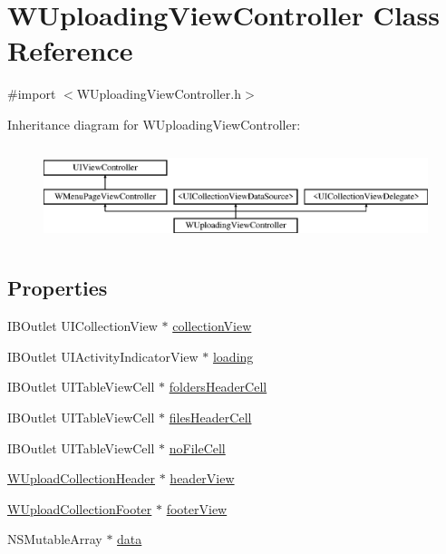 \hypertarget{interface_w_uploading_view_controller}{\section{W\-Uploading\-View\-Controller Class Reference}
\label{interface_w_uploading_view_controller}
}


{\ttfamily \#import $<$W\-Uploading\-View\-Controller.\-h$>$}

Inheritance diagram for W\-Uploading\-View\-Controller\-:\begin{figure}[H]
\begin{center}
\leavevmode
\includegraphics[height=2.857143cm]{interface_w_uploading_view_controller}
\end{center}
\end{figure}
\subsection*{Properties}
\begin{DoxyCompactItemize}
\item 
I\-B\-Outlet U\-I\-Collection\-View $\ast$ \hyperlink{interface_w_uploading_view_controller_aabe11a41ca66d2b6137c9fe6398df4ff}{collection\-View}
\item 
I\-B\-Outlet U\-I\-Activity\-Indicator\-View $\ast$ \hyperlink{interface_w_uploading_view_controller_a0f8c043f0cae730321e3a3cde2db8372}{loading}
\item 
I\-B\-Outlet U\-I\-Table\-View\-Cell $\ast$ \hyperlink{interface_w_uploading_view_controller_ad4783f87ba6e1288e4fa6126a3f5ce8c}{folders\-Header\-Cell}
\item 
I\-B\-Outlet U\-I\-Table\-View\-Cell $\ast$ \hyperlink{interface_w_uploading_view_controller_a2bfd823ee673dadc310fb2f0eaddbdd8}{files\-Header\-Cell}
\item 
I\-B\-Outlet U\-I\-Table\-View\-Cell $\ast$ \hyperlink{interface_w_uploading_view_controller_a6a3ce2d6d03b1ee89f39e5bc0972c76c}{no\-File\-Cell}
\item 
\hyperlink{interface_w_upload_collection_header}{W\-Upload\-Collection\-Header} $\ast$ \hyperlink{interface_w_uploading_view_controller_a4a37e4691d4925916ea14c2e77763b0d}{header\-View}
\item 
\hyperlink{interface_w_upload_collection_footer}{W\-Upload\-Collection\-Footer} $\ast$ \hyperlink{interface_w_uploading_view_controller_a9548272db9278e36876e375f827e1c0c}{footer\-View}
\item 
N\-S\-Mutable\-Array $\ast$ \hyperlink{interface_w_uploading_view_controller_ab85c5136ecef49f74b5945db3e5b8c53}{data}
\end{DoxyCompactItemize}


